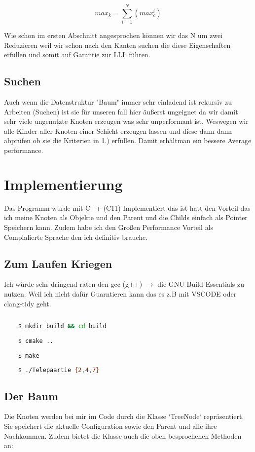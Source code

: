 \documentclass{article}
\begin{document}
\begin{equation}
	max_k =  \sum \limits_{i=1}^N  (max_c ^ i)
\end{equation}

Wie schon im ersten Abschnitt angesprochen können wir das N um zwei Reduzieren weil wir schon nach den Kanten suchen die diese Eigenschaften erfüllen und somit auf Garantie zur LLL führen.

\subsection*{ Suchen }

Auch wenn die Datenstruktur "Baum" immer sehr einladend ist rekursiv zu Arbeiten (Suchen) ist sie für unseren fall hier äußerst ungeignet da wir damit sehr viele ungenutzte Knoten erzeugen was sehr unperformant ist. Weswegen wir alle Kinder aller Knoten einer Schicht erzeugen lassen und diese dann dann abprüfen ob sie die Kriterien in 1.) erfüllen. Damit erhältman ein bessere Average performance.


\section{ Implementierung }

Das Programm wurde mit C++ (C11) Implementiert das ist hatt den Vorteil das ich meine Knoten als Objekte und den Parent und die Childs einfach als Pointer Speichern kann. Zudem habe ich den Großen Performance Vorteil als Complalierte Sprache den ich definitiv brauche.

\subsection*{ Zum Laufen Kriegen }

Ich würde sehr dringend raten den gcc (g++) \(\rightarrow\) die GNU Build Essentials zu nutzen. Weil ich nicht dafür Guarntieren kann das es z.B mit VSCODE oder clang-tidy geht.

\begin{lstlisting}[language=Bash]
	
	$ mkdir build && cd build
	
	$ cmake ..
	
	$ make
	
	$ ./Telepaartie {2,4,7}

\end{lstlisting}

\subsection*{ Der Baum }

Die Knoten werden bei mir im Code durch die Klasse `TreeNode` repräsentiert. Sie speichert die aktuelle Configuration sowie den Parent und alle ihre Nachkommen. Zudem bietet die Klasse auch die oben besprochenen Methoden an:  
\end{document}

